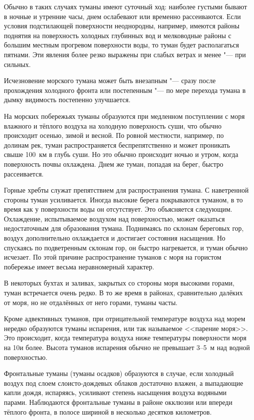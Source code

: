 Обычно в таких случаях туманы имеют суточный ход: наиболее густыми
бывают в ночные и утренние часы, днем ослабевают или временно
рассеиваются. Если условия подстилающей поверхности неоднородны,
например, имеются районы поднятия на поверхность холодных глубинных
вод и мелководные районы с большим местным прогревом поверхности воды,
то туман будет располагаться пятнами. Эти явления более резко выражены
при слабых ветрах и менее "--- при сильных.

Исчезновение морского тумана может быть внезапным "--- сразу после
прохождения холодного фронта или постепенным "--- по мере перехода тумана
в дымку видимость постепенно улучшается.

На морских побережьях туманы образуются при медленном поступлении с
моря влажного и тёплого воздуха на холодную поверхность суши, что
обычно происходит осенью, зимой и весной. По ровной местности,
например, по долинам рек, туман распространяется беспрепятственно и
может проникать свыше 100~км в глубь суши. Но это обычно происходит
ночью и утром, когда поверхность почвы охлаждена. Днем же туман,
попадая на берег, быстро рассеивается.

Горные хребты служат препятствием для распространения тумана. С
наветренной стороны туман усиливается. Иногда высокие берега
покрываются туманом, в то время как у поверхности воды он
отсутствует. Это объясняется следующим. Охлаждение, испытываемое
воздухом над поверхностью, может оказаться недостаточным для
образования тумана. Поднимаясь по склонам береговых гор, воздух
дополнительно охлаждается и достигает состояния насыщения. Но
спускаясь по подветренным склонам гор, он быстро нагревается, и туман
обычно исчезает. По этой причине распространение туманов с моря на
гористом побережье имеет весьма неравномерный характер.

В некоторых бухтах и заливах, закрытых со стороны моря высокими
горами, туман встречается очень редко. В то же время в районах,
сравнительно далёких от моря, но не отдалённых от него горами, туманы
часты.

Кроме адвективных туманов, при отрицательной температуре воздуха над
морем нередко образуются туманы испарения, или так называемое <<парение
моря>>. Это происходит, когда температура воздуха ниже температуры
поверхности моря на 10\grC и более. Высота туманов испарения обычно не
превышает 3--5~м над водной поверхностью.

Фронтальные туманы (туманы осадков) образуются в случае, если холодный
воздух под слоем слоисто-дождевых облаков достаточно влажен, а
выпадающие капли дождя, испаряясь, усиливают степень насыщения воздуха
водяными парами. Наблюдаются фронтальные туманы в районе окклюзии или
впереди тёплого фронта, в полосе шириной в несколько десятков
километров.

